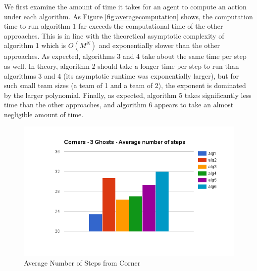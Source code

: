 \documentclass[11pt]{article}
\begin{document}
\begin{multicols}{2}
We first examine the amount of time it takes for an agent to compute an action under each algorithm. As Figure \ref{fig:averagecomputation} shows, the computation time to run algorithm 1 far exceeds the computational time of the other approaches. This is in line with the theoretical asymptotic complexity of algorithm 1 which is $O(M^N)$ and exponentially slower than the other approaches. As expected, algorithms 3 and 4 take about the same time per step as well. In theory, algorithm 2 should take a longer time per step to run than algorithms 3 and 4 (its asymptotic runtime was exponentially larger), but for such small team sizes (a team of 1 and a team of 2), the exponent is dominated by the larger polynomial. Finally, as expected, algorithm 5 takes significantly less time than the other approaches, and algorithm 6 appears to take an almost negligible amount of time. 



\begin{figure}[H]
	\includegraphics[scale=0.45]{cornersteps.png}
	\caption{Average Number of Steps from Corner}
	\label{fig:averagenumstepscorner}
\end{figure}


\end{multicols}
\end{document}
